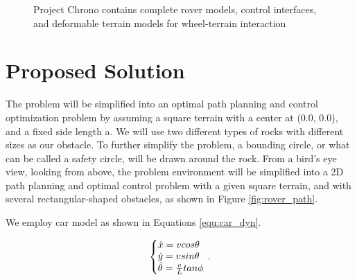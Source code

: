 \documentclass{article}
\begin{document}
\begin{figure}
	\centering     %
	\caption{Project Chrono contains complete rover models, control interfaces, and deformable terrain models for wheel-terrain interaction}
\end{figure}


\section{Proposed Solution}

The problem will be simplified into an optimal path planning and control optimization problem by assuming a square terrain with a center at (0.0, 0.0), and a fixed side length a. We will use two different types of rocks with different sizes as our obstacle. To further simplify the problem, a bounding circle, or what can be called a safety circle, will be drawn around the rock. From a bird's eye view, looking from above, the problem environment will be simplified into a 2D path planning and optimal control problem with a given square terrain, and with several rectangular-shaped obstacles, as shown in Figure \ref{fig:rover_path}.

We employ car model as shown in Equations \ref{equ:car_dyn}.

\begin{equation}
\label{equ:car_dyn}
  \left\{\begin{array}{@{}l@{}}
    \dot{x}=vcos\theta  \\
    \dot{y}=vsin\theta  \\
    \dot{\theta} = \frac{v}{L}tan\phi \\
  \end{array}\right.\,.
\end{equation}
\end{document}
